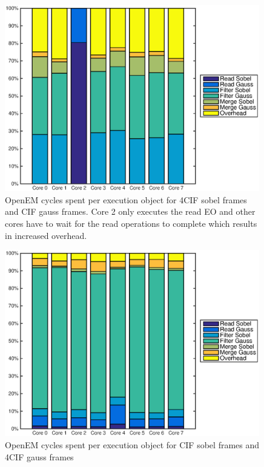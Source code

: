 \begin{figure}[h!]
    \begin{center}
        \includegraphics[width=0.99\textwidth]{images/openem_sobel4cif_gausscif_eo.eps}
        \caption{OpenEM cycles spent per execution object for 4CIF sobel frames
        and CIF gauss frames. Core 2 only executes the read EO and other cores
        have to wait for the read operations to complete which results in
        increased overhead.}
        \label{fig:oem8coreeosobel4cif}
    \end{center}
\end{figure}

\begin{figure}[h!]
    \begin{center}
        \includegraphics[width=0.99\textwidth]{images/openem_sobelcif_gauss4cif_eo.eps}
        \caption{OpenEM cycles spent per execution object for CIF sobel frames
        and 4CIF gauss frames}
        \label{fig:oem8coreeogauss4cif}
    \end{center}
\end{figure}

